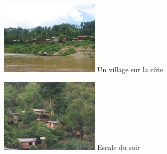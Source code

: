\begin{multicols}{2}
\hspace*{-0.65cm}
\includegraphics[width=4.8cm]{articles/Mekong/1214473400ezNu.jpg}
Un village sur la côte

\hspace*{-0.65cm}
\includegraphics[width=4.8cm]{articles/Mekong/1214473407uNUm.jpg}
Escale du soir

\end{multicols}


